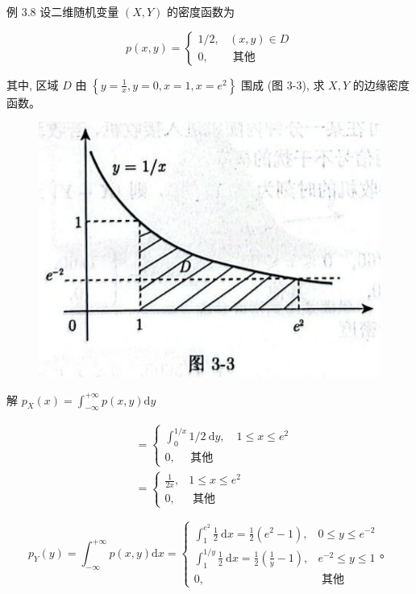 \documentclass{beamer}
\begin{document}
	\begin{frame}
		例 3.8 设二维随机变量 $(X, Y)$ 的密度函数为
		
		$$
		p(x, y)=\left\{\begin{array}{cc}
			1 / 2, & (x, y) \in D \\
			0, & \text { 其他 }
		\end{array}\right.
		$$
		
		其中, 区域 $D$ 由 $\left\{y=\frac{1}{x}, y=0, x=1, x=e^{2}\right\}$ 围成 (图 3-3), 求 $X, Y$ 的边缘密度函数。
		
		\begin{figure}
			\centering
			\includegraphics[scale = 0.3]{figures/figure3-3.png}
		\end{figure}
	\end{frame}
	
	\begin{frame}
		解 $p_{X}(x)=\int_{-\infty}^{+\infty} p(x, y) \mathrm{d} y$
		
		$$
		\begin{aligned}
			& =\left\{\begin{array}{c}
				\int_{0}^{1 / x} 1 / 2 \mathrm{~d} y, \quad 1 \leqslant x \leqslant e^{2} \\
				0, \quad \text { 其他 }
			\end{array}\right. \\
			& =\left\{\begin{array}{cc}
				\frac{1}{2 x}, & 1 \leqslant x \leqslant e^{2} \\
				0, & \text { 其他 }
			\end{array}\right.
		\end{aligned}
		$$
		
		$$
		p_{Y}(y)=\int_{-\infty}^{+\infty} p(x, y) \mathrm{d} x=\left\{\begin{array}{cc}
			\int_{1}^{e^{2}} \frac{1}{2} \mathrm{~d} x=\frac{1}{2}\left(e^{2}-1\right), & 0 \leqslant y \leqslant e^{-2} \\
			\int_{1}^{1 / y} \frac{1}{2} \mathrm{~d} x=\frac{1}{2}\left(\frac{1}{y}-1\right), & e^{-2} \leqslant y \leqslant 1 \\
			0, & \text { 其他 }
		\end{array} 。\right.
		$$
	\end{frame}
	
\end{document}
